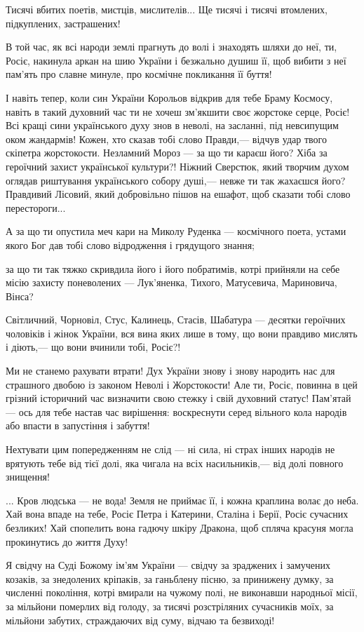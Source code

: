Тисячі вбитих поетів, мистців, мислителів... Ще тисячі і тисячі втомлених,
підкуплених, застрашених!

В той час, як всі народи землі прагнуть до волі і знаходять шляхи до неї, ти,
Росіє, накинула аркан на шию України і безжально душиш її, щоб вибити з неї
пам'ять про славне минуле, про космічне покликання її буття!

І навіть тепер, коли син України Корольов відкрив для тебе Браму Космосу,
навіть в такий духовний час ти не хочеш зм'якшити своє жорстоке серце, Росіє!
Всі кращі сини українського духу знов в неволі, на засланні, під невсипущим
оком жандармів! Кожен, хто сказав тобі слово Правди,— відчув удар твого
скіпетра жорстокости. Незламний Мороз — за що ти караєш його? Хіба за героїчний
захист української культури?! Ніжний Сверстюк, який творчим духом оглядав
риштування українського собору душі,— невже ти так жахаєшся його? Правдивий
Лісовий, який добровільно пішов на ешафот, щоб сказати тобі слово
перестороги...

А за що ти опустила меч кари на Миколу Руденка — космічного поета, устами якого
Бог дав тобі слово відродження і грядущого знання;

за що ти так тяжко скривдила його і його побратимів, котрі прийняли на себе
місію захисту поневолених — Лук'яненка, Тихого, Матусевича, Мариновича, Вінса?

Світличний, Чорновіл, Стус, Калинець, Стасів, Шабатура — десятки героїчних
чоловіків і жінок України, вся вина яких лише в тому, що вони правдиво мислять
і діють,— що вони вчинили тобі, Росіє?!

Ми не станемо рахувати втрати! Дух України знову і знову народить нас для
страшного двобою із законом Неволі і Жорстокости! Але ти, Росіє, повинна в цей
грізний історичний час визначити свою стежку і свій духовний статус! Пам'ятай —
ось для тебе настав час вирішення: воскреснути серед вільного кола народів або
впасти в запустіння і забуття!

Нехтувати цим попередженням не слід — ні сила, ні страх інших народів не
врятують тебе від тієї долі, яка чигала на всіх насильників,— від долі повного
знищення!

... Кров людська — не вода! Земля не приймає її, і кожна краплина волає до
неба. Хай вона впаде на тебе, Росіє Петра і Катерини, Сталіна і Берії, Росіє
сучасних безликих! Хай спопелить вона гадючу шкіру Дракона, щоб спляча красуня
могла прокинутись до життя Духу!

Я свідчу на Суді Божому ім'ям України — свідчу за зраджених і замучених
козаків, за знедолених кріпаків, за ганьблену пісню, за принижену думку, за
численні покоління, котрі вмирали на чужому полі, не виконавши народньої місії,
за мільйони померлих від голоду, за тисячі розстріляних сучасників моїх, за
мільйони забутих, страждаючих від суму, відчаю та безвиході!

